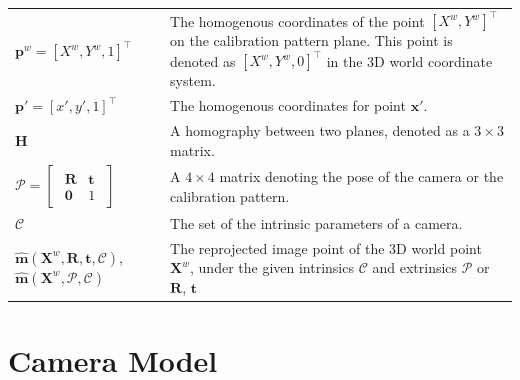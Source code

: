 \documentclass{report}
\begin{document}
\begin{supertabular}{p{0.3\textwidth}p{0.67\textwidth}}
$\mathbf{p}^w = [X^w, Y^w, 1]^\top$ & The homogenous coordinates of the point $[X^w, Y^w]^\top$ on the calibration pattern plane. This point is denoted as $[X^w, Y^w, 0]^\top$ in the 3D world coordinate system. \\[8pt]
$\mathbf{p}' = [x', y', 1]^\top$ & The homogenous coordinates for point $\mathbf{x}'$. \\[8pt]

$\mathbf{H}$ & A homography between two planes, denoted as a $3\times3$ matrix. \\[8pt]

$\mathcal{P} = 
\begin{bmatrix}
	\begin{array}{cc}
	\mathbf{R} & \mathbf{t}\\
	\mathbf{0} & 1
	\end{array}
\end{bmatrix}$ & A $4\times4$ matrix denoting the pose of the camera or the calibration pattern. \\[8pt]

$\mathcal{C}$ & The set of the intrinsic parameters of a camera. \\[8pt]

$\hat{\mathbf{m}}(\mathbf{X}^w, \mathbf{R}, \mathbf{t}, \mathcal{C})$, $\hat{\mathbf{m}}(\mathbf{X}^w, \mathcal{P}, \mathcal{C})$ & The reprojected image point of the 3D world point $\mathbf{X}^w$, under the given intrinsics $\mathcal{C}$ and extrinsics $\mathcal{P}$ or $\mathbf{R}$, $\mathbf{t}$\\[8pt]

\end{supertabular}

\chapter{Camera Model}
\end{document}
